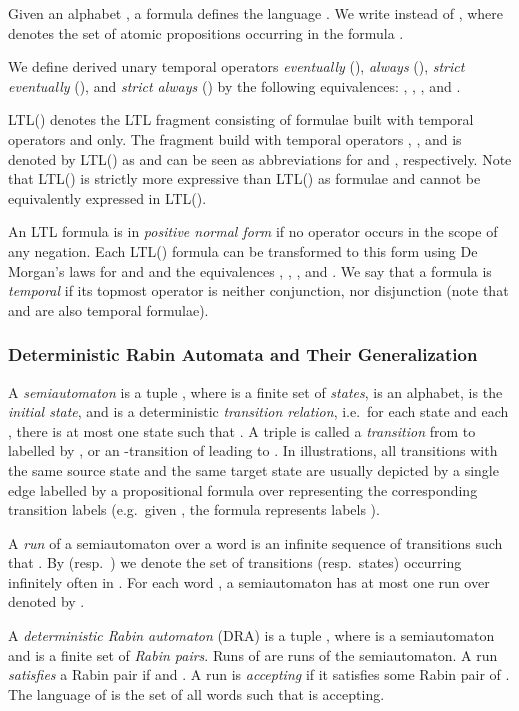 \documentclass{llncs}
\begin{document}
Given an alphabet , a formula  defines the language
. We 
write  instead of , where
 denotes the set of atomic propositions occurring in the
formula .

We define derived unary temporal operators \emph{eventually}
(), \emph{always} (), \emph{strict eventually} (), and
\emph{strict always} () by the
following equivalences: ,
, , and
.

LTL() denotes the LTL fragment consisting of formulae built with
temporal operators  and  only.  The fragment build with temporal
operators , ,  and  is denoted by LTL() as
 and  can be seen as abbreviations for
 and , respectively.  Note
that LTL() is strictly more expressive than LTL() as
formulae  and  cannot be equivalently expressed in
LTL(). 

An LTL formula is in \emph{positive normal form} if no operator occurs in
the scope of any negation.  Each LTL() formula can be transformed
to this form using De Morgan's laws for  and  and the
equivalences , ,
, and . We say that
a formula is \emph{temporal} if its topmost operator is neither conjunction,
nor disjunction (note that  and  are also temporal formulae).



\subsubsection{Deterministic Rabin Automata and Their Generalization}



A \emph{semiautomaton} is a tuple , where  is
a finite set of \emph{states},  is an alphabet,  is the
\emph{initial state}, and  is a
deterministic \emph{transition relation}, i.e.~for each state  and
each , there is at most one state  such that
. A triple  is called a
\emph{transition} from  to  labelled by , or an
-transition of  leading to .  In illustrations, all
transitions with the same source state and the same target state are usually
depicted by a single edge labelled by a propositional formula  over
 representing the corresponding transition labels (e.g.~given
, the formula  represents labels
).

A \emph{run} of a semiautomaton  over a word  is an infinite sequence  of transitions such that
. By  (resp.~) we denote the set of
transitions (resp.~states) occurring infinitely often in . For each
word , a semiautomaton has at most one run over 
denoted by .

A \emph{deterministic Rabin automaton} (DRA) is a tuple
, where  is a
semiautomaton and  is a finite set
of \emph{Rabin pairs}.
Runs of  are runs of the semiautomaton.  A run  \emph{satisfies}
a Rabin pair  if  and
.  A run is \emph{accepting} if it
satisfies some Rabin pair of . The language of  is the set
 of all words  such that  is
accepting.
\end{document}

